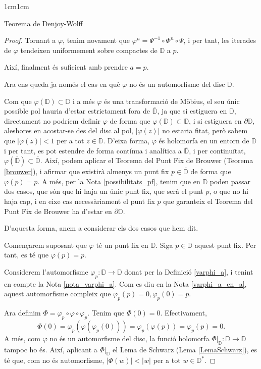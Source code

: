 \begin{adjustwidth}{1cm}{1cm}
\begin{subsection}{Teorema de Denjoy-Wolff}
\begin{proof}
        Tornant a $\varphi$, tenim novament que $\varphi^n=\Psi^{-1}\circ\Phi^n\circ\Psi$, i per tant, les iterades de $\varphi$ tendeixen uniformement sobre compactes de $\mathbb{D}$ a $p$.

        Així, finalment és suficient amb prendre $a=p$.

        Ara ens queda ja només el cas en què $\varphi$ no és un automorfisme del disc $\mathbb{D}$. 

        Com que $\varphi(\mathbb{D})\subset \mathbb{D}$ i a més $\varphi$ és una transformació de Möbius, el seu únic possible pol hauria d'estar estrictament fora de $\overline{\mathbb{D}}$, ja que si estiguera en $\mathbb{D}$, directament no podríem definir $\varphi$ de forma que $\varphi(\mathbb{D})\subset \mathbb{D}$, i si estiguera en $\partial\mathbb{D}$, aleshores en acostar-se des del disc al pol, $|\varphi(z)|$ no estaria fitat, però sabem que $|\varphi(z)|<1$ per a tot $z\in \mathbb{D}$. D'eixa forma, $\varphi$ és holomorfa en un entorn de $\overline{\mathbb{D}}$ i per tant, es pot estendre de forma contínua i analítica a $\overline{\mathbb{D}}$, i per continuïtat, $\varphi(\overline{\mathbb{D}})\subset \overline{\mathbb{D}}$. Així, podem aplicar el Teorema del Punt Fix de Brouwer (Teorema \ref{brouwer}), i afirmar que existirà almenys un punt fix $p\in\overline{\mathbb{D}}$ de forma que $\varphi(p)=p$. A més, per la Nota \ref{possibilitats_pf}, tenim que en $\mathbb{D}$ poden passar dos casos, que són que hi haja un únic punt fix, que serà el punt $p$, o que no hi haja cap, i en eixe cas necessàriament el punt fix $p$ que garanteix el Teorema del Punt Fix de Brouwer ha d'estar en $\partial \mathbb{D}$.

        D'aquesta forma, anem a considerar els dos casos que hem dit.

        Començarem suposant que $\varphi$ té un punt fix en $\mathbb{D}$. Siga $p\in \mathbb{D}$ aquest punt fix. Per tant, es té que $\varphi(p)=p$.

        Considerem l'automorfisme $\varphi_p:\mathbb{D}\to \mathbb{D}$ donat per la Definició \ref{varphi_a}, i tenint en compte la Nota \ref{nota_varphi_a}. Com es diu en la Nota \ref{varphi_a_en_a}, aquest automorfisme compleix que $\varphi_p(p)=0, \varphi_p(0)=p$.

        Ara definim $\Phi=\varphi_p\circ\varphi\circ\varphi_p$. Tenim que $\Phi(0)=0$. Efectivament, 
        \[
            \Phi(0)=\varphi_p(\varphi(\varphi_p(0)))=\varphi_p(\varphi(p))=\varphi_p(p)=0.
        \]
        A més, com $\varphi$ no és un automorfisme del disc, la funció holomorfa $\Phi|_{\mathbb{D}}:\mathbb{D}\to \mathbb{D}$ tampoc ho és. Així, aplicant a $\Phi|_{\mathbb{D}}$ el Lema de Schwarz (Lema \ref{LemaSchwarz}), es té que, com no és automorfisme, $|\Phi(w)|<|w|$ per a tot $w\in \mathbb{D}^*$.


\end{proof}
\end{subsection}
\end{adjustwidth}
